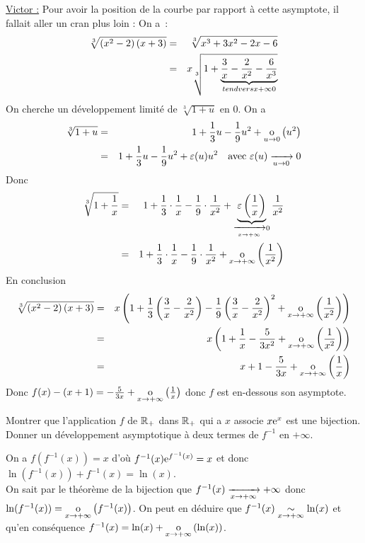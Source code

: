 \documentclass{magnolia}
\begin{document}
\begin{exos}
\begin{sol}
\underline{Victor :}
Pour avoir la position de la courbe par rapport à cette asymptote, il fallait aller un cran plus loin :
On a~:
  \begin{eqnarray*}
  \sqrt[3]{\left(x^2-2\right)\left(x+3\right)}
  &=& \sqrt[3]{x^3+3x^2-2x-6}\\
  &=& x\sqrt[3]{1+\underbrace{\frac{3}{x}-\frac{2}{x^2}-\frac{6}{x^3}}_{tendvers{x}{+\infty}0}}
  \end{eqnarray*}
  On cherche un développement limité de
  $\sqrt[3]{1+u}$ en 0.
 On a 
  \begin{eqnarray*}
  \sqrt[3]{1+u}
  &=& 1+\frac{1}{3}u-\frac{1}{9}u^2+\underset{u \rightarrow 0}{\text{o}}\left(u^2\right)\\
  &=& 1+\frac{1}{3}u-\frac{1}{9}u^2+\varepsilon(u)u^2
      \quad \text{avec $\varepsilon(u)\xrightarrow[u\rightarrow 0]{}0$}\\
  \end{eqnarray*}
  Donc
  \begin{eqnarray*}
  \sqrt[3]{1+\frac{1}{x}}
  &=& 1+\frac{1}{3}\cdot\frac{1}{x}-\frac{1}{9}\cdot \frac{1}{x^2}+
      \underbrace{\varepsilon\left(\frac{1}{x}\right)}_{\xrightarrow[x\rightarrow +\infty]{}0}
      \frac{1}{x^2}\\
  &=& 1+\frac{1}{3}\cdot\frac{1}{x}-\frac{1}{9}\cdot \frac{1}{x^2}+\underset{x \rightarrow +\infty}{\text{o}}\left(\frac{1}{x^2}\right)
  \end{eqnarray*}
  En conclusion
  \begin{eqnarray*}
  \sqrt[3]{\left(x^2-2\right)\left(x+3\right)}
  &=& x\left(1+\frac{1}{3}\left(\frac{3}{x}-\frac{2}{x^2}\right)-\frac{1}{9}\left(\frac{3}{x}-\frac{2}{x^2}\right)^2+\underset{x \rightarrow +\infty}{\text{o}}\left(\frac{1}{x^2}\right)\right)\\
  &=& x\left(1+\frac{1}{x}-\frac{5}{3x^2}+\underset{x \rightarrow +\infty}{\text{o}}\left(\frac{1}{x^2}\right)\right)\\
  &=& x+1-\frac{5}{3x}+\underset{x \rightarrow +\infty}{\text{o}}\left(\frac{1}{x}\right)
  \end{eqnarray*}
  Donc $f(x)-(x+1)=-\frac{5}{3x}+\underset{x \rightarrow +\infty}{\text{o}}\left(\frac{1}{x}\right)$ donc $f$ est en-dessous son asymptote.
  \end{sol}
\exo 
  Montrer que l'application $f$ de $\mathbb{R}_+$ dans $\mathbb{R}_+$ qui a $x$ associe
  $x{\rm e}^x$ est une bijection. Donner un développement asymptotique à deux termes
  de $f^{-1}$ en $+\infty$.
  \begin{sol}
  On a $f(f^{-1}(x))=x$ d'où $f^{-1}(x){\rm e}^{f^{-1}(x)}=x$ et donc $\ln(f^{-1}(x))+f^{-1}(x)=\ln(x)$.\\
  On sait par le théorème de la bijection que $f^{-1}(x)\xrightarrow[x\rightarrow +\infty]{}+\infty$ donc $\ln(f^{-1}(x))=\underset{x \rightarrow +\infty}{\text{o}}\left(f^{-1}(x)\right)$. On peut en déduire que $f^{-1}(x)\underset{x\rightarrow +\infty}{\sim}\ln(x)$ et qu'en conséquence $f^{-1}(x)=\ln(x)+\underset{x \rightarrow +\infty}{\text{o}}\left(\ln(x)\right)$.
  

\end{sol}
\end{exos}
\end{document}
